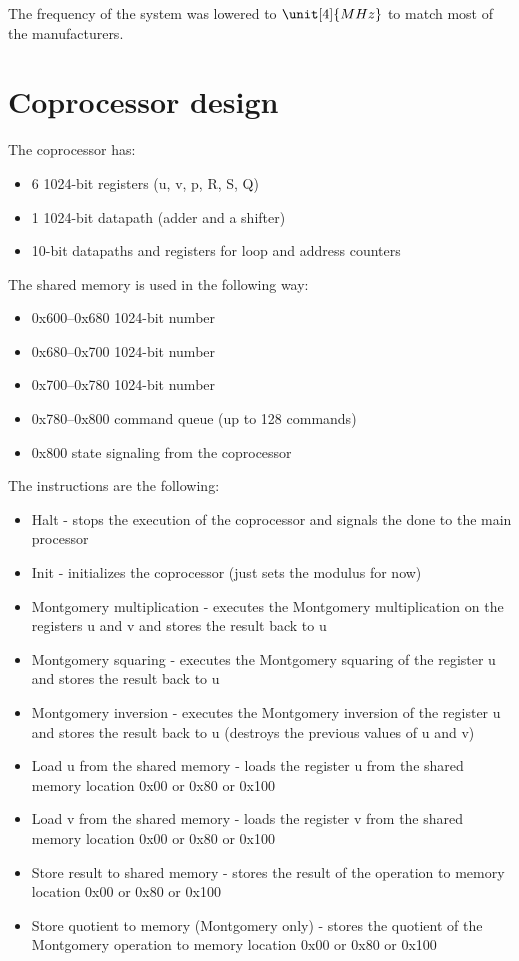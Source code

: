 \documentclass[a4paper, 12pt]{article}
\begin{document}
The frequency of the system was lowered to $\unit[4]{MHz}$ to match
most of the manufacturers.

\section{Coprocessor design}

The coprocessor has:
\begin{itemize}
\item 6 1024-bit registers (u, v, p, R, S, Q)
\item 1 1024-bit datapath (adder and a shifter)
\item 10-bit datapaths and registers for loop and address counters
\end{itemize}

\noindent
The shared memory is used in the following way:
\begin{itemize}
\item 0x600--0x680 1024-bit number
\item 0x680--0x700 1024-bit number
\item 0x700--0x780 1024-bit number
\item 0x780--0x800 command queue (up to 128 commands)
\item 0x800 state signaling from the coprocessor
\end{itemize}

\noindent
The instructions are the following:
\begin{itemize}
\item Halt - stops the execution of the coprocessor and signals the
  done to the main processor
\item Init - initializes the coprocessor (just sets the modulus for now)
\item Montgomery multiplication - executes the Montgomery
  multiplication on the registers u and v and stores the result back
  to u
\item Montgomery squaring - executes the Montgomery squaring of the
  register u and stores the result back to u
\item Montgomery inversion - executes the Montgomery inversion of the
  register u and stores the result back to u (destroys the previous
  values of u and v)
\item Load u from the shared memory - loads the register u from the
  shared memory location 0x00 or 0x80 or 0x100
\item Load v from the shared memory - loads the register v from the
  shared memory location 0x00 or 0x80 or 0x100
\item Store result to shared memory - stores the result of the
  operation to memory location 0x00 or 0x80 or 0x100
\item Store quotient to memory (Montgomery only) - stores the quotient
  of the Montgomery operation to memory location 0x00 or 0x80 or 0x100
\end{itemize}
\end{document}
